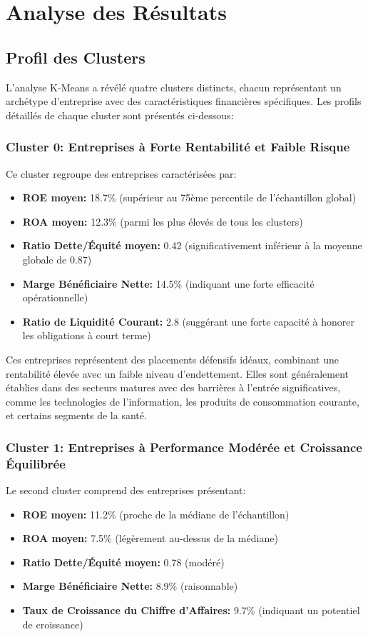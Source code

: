 \documentclass[12pt]{article}
\begin{document}
\newpage
\section{Analyse des Résultats}
\subsection{Profil des Clusters}
L'analyse K-Means a révélé quatre clusters distincts, chacun représentant un archétype d'entreprise avec des caractéristiques financières spécifiques. Les profils détaillés de chaque cluster sont présentés ci-dessous:

\subsubsection{Cluster 0: Entreprises à Forte Rentabilité et Faible Risque}
Ce cluster regroupe des entreprises caractérisées par:
\begin{itemize}
    \item \textbf{ROE moyen:} 18.7\% (supérieur au 75ème percentile de l'échantillon global)
    \item \textbf{ROA moyen:} 12.3\% (parmi les plus élevés de tous les clusters)
    \item \textbf{Ratio Dette/Équité moyen:} 0.42 (significativement inférieur à la moyenne globale de 0.87)
    \item \textbf{Marge Bénéficiaire Nette:} 14.5\% (indiquant une forte efficacité opérationnelle)
    \item \textbf{Ratio de Liquidité Courant:} 2.8 (suggérant une forte capacité à honorer les obligations à court terme)
\end{itemize}

Ces entreprises représentent des placements défensifs idéaux, combinant une rentabilité élevée avec un faible niveau d'endettement. Elles sont généralement établies dans des secteurs matures avec des barrières à l'entrée significatives, comme les technologies de l'information, les produits de consommation courante, et certains segments de la santé.

\subsubsection{Cluster 1: Entreprises à Performance Modérée et Croissance Équilibrée}
Le second cluster comprend des entreprises présentant:
\begin{itemize}
    \item \textbf{ROE moyen:} 11.2\% (proche de la médiane de l'échantillon)
    \item \textbf{ROA moyen:} 7.5\% (légèrement au-dessus de la médiane)
    \item \textbf{Ratio Dette/Équité moyen:} 0.78 (modéré)
    \item \textbf{Marge Bénéficiaire Nette:} 8.9\% (raisonnable)
    \item \textbf{Taux de Croissance du Chiffre d'Affaires:} 9.7\% (indiquant un potentiel de croissance)
\end{itemize}
\end{document}
